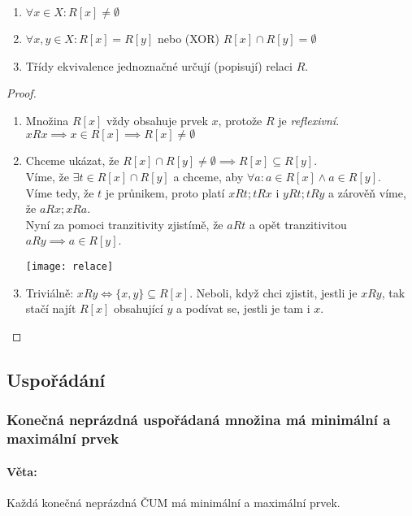 \documentclass[10pt,a4paper]{article}
\begin{document}
\begin{enumerate}[label=(\roman*)]
    \item $\forall x \in X: R[x] \neq \emptyset$
    \item $\forall x,y \in X: R[x] = R[y]$ nebo (XOR) $R[x] \cap R[y] = \emptyset$
    \item Třídy ekvivalence jednoznačné určují (popisují) relaci $R$.
\end{enumerate}

\begin{proof}
    $ $
    \begin{enumerate}[label=(\roman*)]
        \item Množina $R[x]$ vždy obsahuje prvek $x$, protože $R$ je \textit{reflexivní}. $xRx \implies x\in R[x] \implies R[x] \neq \emptyset$
        \item Chceme ukázat, že $R[x]\cap R[y] \neq \emptyset \implies R[x] \subseteq R[y]$. \\
        Víme, že $\exists t \in R[x] \cap R[y]$ a chceme, aby $\forall a: a \in R[x] \land a \in R[y]$.\\
        Víme tedy, že $t$ je průnikem, proto platí $xRt; tRx$ i $yRt; tRy$ a zárověň víme, že $aRx; xRa$.\\
        Nyní za pomoci tranzitivity zjistímě, že $aRt$ a opět tranzitivitou $aRy \implies a\in R[y]$. \\
        \begin{center}
            \texttt{[image: relace]}
        \end{center}

        \item Triviálně: $xRy \iff \{x,y\} \subseteq R[x]$. Neboli, když chci zjistit, jestli je $xRy$, tak stačí najít $R[x]$ obsahující $y$ a podívat se, jestli je tam i $x$.
    \end{enumerate}
\end{proof}

\subsection{Uspořádání}
\subsubsection{Konečná neprázdná uspořádaná množina má minimální a maximální prvek}

\paragraph*{Věta: } Každá konečná neprázdná ČUM má minimální a maximální prvek.
\end{document}
